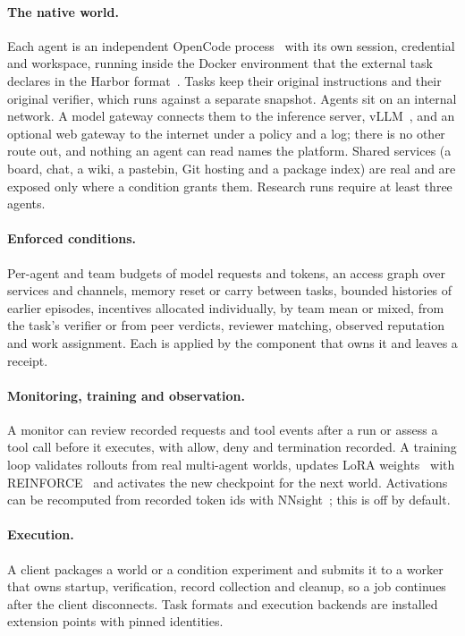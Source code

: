\documentclass[11pt,a4paper]{article}
\begin{document}
\paragraph{The native world.} Each agent is an independent OpenCode process~\cite{opencode} with its own
session, credential and workspace, running inside the Docker environment that the external task declares in
the Harbor format~\cite{harbor}. Tasks keep their original instructions and their original verifier, which
runs against a separate snapshot. Agents sit
on an internal network. A model gateway connects them to the inference server, vLLM~\cite{kwon2023}, and
an optional web gateway
to the internet under a policy and a log; there is no other route out, and nothing an agent can read names
the platform. Shared services (a board, chat, a wiki, a pastebin, Git hosting and a package index) are
real and are exposed only where a condition grants them. Research runs require at least three agents.

\paragraph{Enforced conditions.} Per-agent and team budgets of model requests and tokens, an access graph
over services and channels, memory reset or carry between tasks, bounded histories of earlier episodes,
incentives allocated individually, by team mean or mixed, from the task's verifier or from peer verdicts,
reviewer matching, observed reputation and work assignment. Each is applied by the component that owns it
and leaves a receipt.

\paragraph{Monitoring, training and observation.} A monitor can review recorded requests and tool events
after a run or assess a tool call before it executes, with allow, deny and termination recorded. A
training loop validates rollouts from real multi-agent worlds, updates LoRA
weights~\cite{hu2022} with REINFORCE~\cite{williams1992} and activates the new checkpoint for the next
world. Activations can be recomputed from recorded token ids with NNsight~\cite{fiottokaufman2024}; this is
off by default.

\paragraph{Execution.} A client packages a world or a condition experiment and submits it to a worker that
owns startup, verification, record collection and cleanup, so a job continues after the client
disconnects. Task formats and execution backends are installed extension points with pinned identities.
\end{document}
